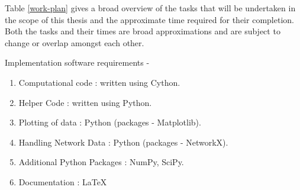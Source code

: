 Table \ref{work-plan} gives a broad overview of the tasks that will be undertaken in the scope of this thesis and the approximate time required for their completion. Both the tasks and their times are broad approximations and are subject to change or overlap amongst each other.

Implementation software requirements - 
\begin{enumerate}
	\item Computational code : written using Cython.
	\item Helper Code : written using Python.
	\item Plotting of data : Python (packages - Matplotlib).
	\item Handling Network Data : Python (packages - NetworkX).
	\item Additional Python Packages : NumPy, SciPy.
	\item Documentation : \LaTeX
\end{enumerate}
